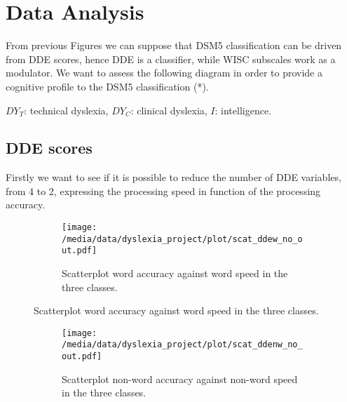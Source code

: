 \documentclass[11pt, a4paper, twoside, openright]{article}
\begin{document}
\clearpage

\section{Data Analysis}
From previous Figures we can suppose that DSM5 classification can be
driven from DDE scores, hence DDE is a classifier, while WISC
subscales work as a modulator. We want to assess the following diagram
in order to provide a cognitive profile to the DSM5 classification (*).

\begin{center}
\end{center}

\small{$DY_T$: technical dyslexia, $DY_C$: clinical dyslexia, $I$: intelligence.}

\subsection{DDE scores}
Firstly we want to see if it is possible to reduce the number of DDE
variables, from 4 to 2, expressing the processing speed in function of
the processing accuracy.
\begin{figure}[h!] 
\centering 
\begin{subfigure}{1\textwidth}
\centering
\texttt{[image: /media/data/dyslexia\_project/plot/scat\_ddew\_no\_out.pdf]}
\caption{Scatterplot word accuracy against word speed in the three classes.}
\label{fig:7a}
\end{subfigure}
\end{figure}
\begin{figure}
\ContinuedFloat
\centering 
\begin{subfigure}{1\textwidth}
\centering
\texttt{[image: /media/data/dyslexia\_project/plot/scat\_ddenw\_no\_out.pdf]}
\caption{Scatterplot non-word accuracy against non-word speed in the three classes.}
\label{fig:7b}
\end{subfigure}
\caption{}
\label{fig:7}
\end{figure}
\end{document}
